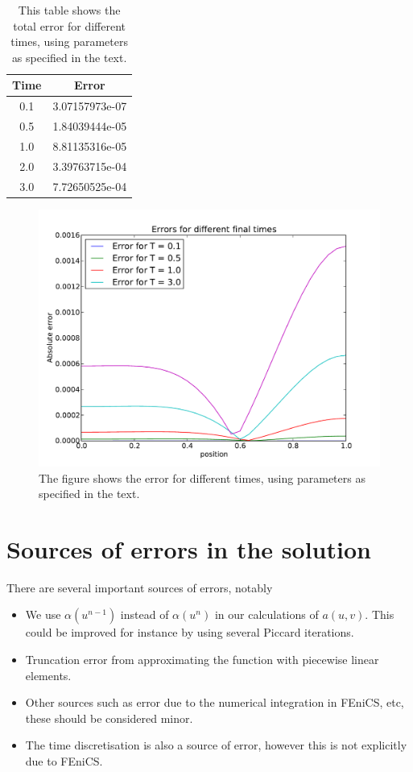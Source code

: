 \documentclass[12pt]{article}
\begin{document}
\begin{table}[position specifier]
\centering
\begin{tabular}{|c|c|}
\hline
Time & Error \\
\hline
0.1 &  3.07157973e-07    \\
0.5 &  1.84039444e-05   \\
1.0 &   8.81135316e-05    \\
2.0 &   3.39763715e-04\\
3.0 &   7.72650525e-04\\
\hline
\end{tabular}
\caption{\label{tab:1}This table shows the total error for different times, using parameters as specified in the text.}
\end{table}

\begin{figure}
\centering
\includegraphics[width=13cm]{errorplot.pdf}
\caption{\label{fig:1} The figure shows the error for different times, using parameters as specified in the text.}
\end{figure}


\section{Sources of errors in the solution}
There are several important sources of errors, notably
\begin{itemize}
 \item We use $\alpha(u^{n-1})$ instead of $\alpha(u^n)$ in our calculations of $a(u,v)$. This could be improved for instance by using several Piccard iterations.
 
 \item Truncation error from approximating the function with piecewise linear elements.

 \item Other sources such as error due to the numerical integration in FEniCS, etc, these should be considered minor.
 
 \item The time discretisation is also a source of error, however this is not explicitly due to FEniCS. 
 \end{itemize}
\end{document}

